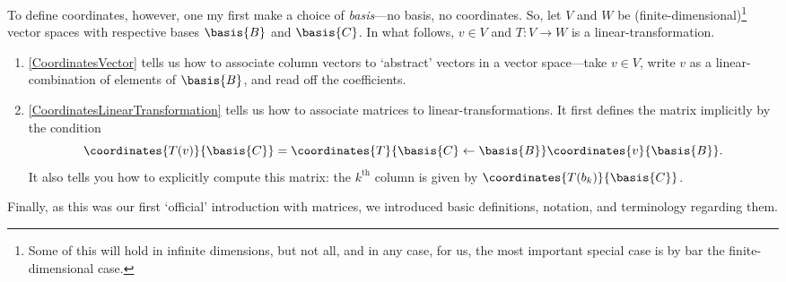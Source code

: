 To define coordinates, however, one my first make a choice of \emph{basis}---no basis, no coordinates.  So, let $V$ and $W$ be (finite-dimensional)\footnote{Some of this will hold in infinite dimensions, but not all, and in any case, for us, the most important special case is by bar the finite-dimensional case.} vector spaces with respective bases $\basis{B}$ and $\basis{C}$.  In what follows, $v\in V$ and $T\colon V\rightarrow W$ is a linear-transformation.
\begin{enumerate}
	\item \cref{CoordinatesVector} tells us how to associate column vectors to `abstract' vectors in a vector space---take $v\in V$, write $v$ as a linear-combination of elements of $\basis{B}$, and read off the coefficients.
	\item \cref{CoordinatesLinearTransformation} tells us how to associate matrices to linear-transformations.  It first defines the matrix implicitly by the condition
	\begin{equation}
		\coordinates{T(v)}{\basis{C}}=\coordinates{T}{\basis{C}\leftarrow \basis{B}}\coordinates{v}{\basis{B}}.
	\end{equation}
	It also tells you how to explicitly compute this matrix:  the $k^{\text{th}}$ column is given by $\coordinates{T(b_k)}{\basis{C}}$.
\end{enumerate}

Finally, as this was our first `official' introduction with matrices, we introduced basic definitions, notation, and terminology regarding them.